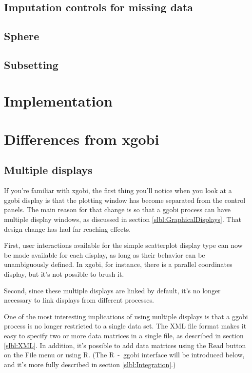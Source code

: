 \documentclass[11pt]{article}
\begin{document}
\subsection{Imputation controls for missing data}
\subsection{Sphere}
\label{slbl:Sphere}
\subsection{Subsetting}

\section{Implementation}

\section{Differences from xgobi}

\subsection {Multiple displays}

If you're familiar with xgobi, the first thing you'll notice
when you look at a ggobi display is that the plotting window
has become separated from the control panels.  The main reason
for that change is so that a ggobi process can have multiple
display windows, as discussed in section
\ref{slbl:GraphicalDisplays}.   That design change has had
far-reaching effects.

First, user interactions available for the simple scatterplot display
type can now be made available for each display, as long as their
behavior can be unambiguously defined.  In xgobi, for instance, there
is a parallel coordinates display, but it's not possible to brush
it.

Second, since these multiple displays are linked by default, it's no
longer necessary to link displays from different processes.

One of the most interesting implications of using multiple displays
is that a ggobi process is no longer restricted to a single data
set.  The XML file format makes it easy to specify two or more data
matrices in a single file, as described in section \ref{slbl:XML}.
In addition, it's possible to add data matrices using the Read button
on the File menu or using R.  (The R~-~ggobi interface will be
introduced below, and it's more fully described in section
\ref{slbl:Integration}.)
\end{document}
